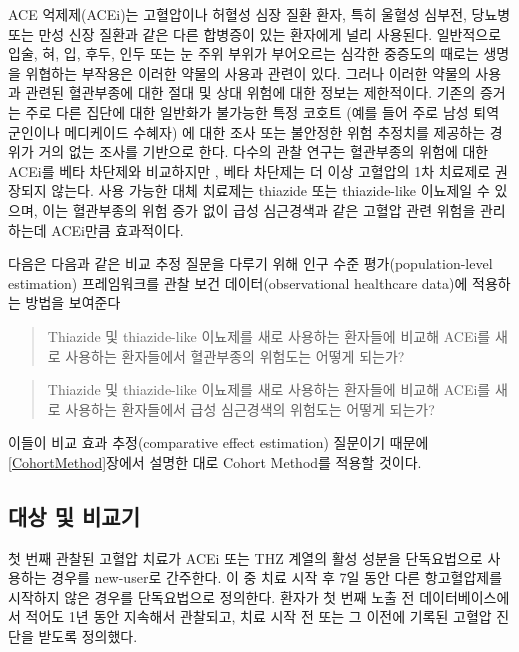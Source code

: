 \documentclass[11pt]{book}
\theoremstyle{definition}
\theoremstyle{definition}
\theoremstyle{definition}
\theoremstyle{remark}
\begin{document}
ACE 억제제(ACEi)는 고혈압이나 허혈성 심장 질환 환자, 특히 울혈성 심부전,
당뇨병 또는 만성 신장 질환과 같은 다른 합병증이 있는 환자에게 널리
사용된다. \citep{zaman_2002} 일반적으로 입술, 혀, 입, 후두, 인두 또는 눈
주위 부위가 부어오르는 심각한 중증도의 때로는 생명을 위협하는 부작용은
이러한 약물의 사용과 관련이 있다. \citep{sabroe_1997} 그러나 이러한
약물의 사용과 관련된 혈관부종에 대한 절대 및 상대 위험에 대한 정보는
제한적이다. 기존의 증거는 주로 다른 집단에 대한 일반화가 불가능한 특정
코호트 (예를 들어 주로 남성 퇴역 군인이나 메디케이드 수혜자) 에 대한
조사 또는 불안정한 위험 추정치를 제공하는 경위가 거의 없는 조사를
기반으로 한다. \citep{powers_2012} 다수의 관찰 연구는 혈관부종의 위험에
대한 ACEi를 베타 차단제와 비교하지만 \citep{magid_2010, toh_2012}, 베타
차단제는 더 이상 고혈압의 1차 치료제로 권장되지 않는다.
\citep{whelton_2018} 사용 가능한 대체 치료제는 thiazide 또는
thiazide-like 이뇨제일 수 있으며, 이는 혈관부종의 위험 증가 없이 급성
심근경색과 같은 고혈압 관련 위험을 관리하는데 ACEi만큼 효과적이다.

다음은 다음과 같은 비교 추정 질문을 다루기 위해 인구 수준
평가(population-level estimation) 프레임워크를 관찰 보건
데이터(observational healthcare data)에 적용하는 방법을 보여준다

\begin{quote}
Thiazide 및 thiazide-like 이뇨제를 새로 사용하는 환자들에 비교해 ACEi를
새로 사용하는 환자들에서 혈관부종의 위험도는 어떻게 되는가?
\end{quote}

\begin{quote}
Thiazide 및 thiazide-like 이뇨제를 새로 사용하는 환자들에 비교해 ACEi를
새로 사용하는 환자들에서 급성 심근경색의 위험도는 어떻게 되는가?
\end{quote}

이들이 비교 효과 추정(comparative effect estimation) 질문이기 때문에
\ref{CohortMethod}장에서 설명한 대로 Cohort Method를 적용할 것이다.

\subsection{대상 및 비교기}\label{--}

첫 번째 관찰된 고혈압 치료가 ACEi 또는 THZ 계열의 활성 성분을
단독요법으로 사용하는 경우를 new-user로 간주한다. 이 중 치료 시작 후 7일
동안 다른 항고혈압제를 시작하지 않은 경우를 단독요법으로 정의한다.
환자가 첫 번째 노출 전 데이터베이스에서 적어도 1년 동안 지속해서
관찰되고, 치료 시작 전 또는 그 이전에 기록된 고혈압 진단을 받도록
정의했다.
\end{document}
